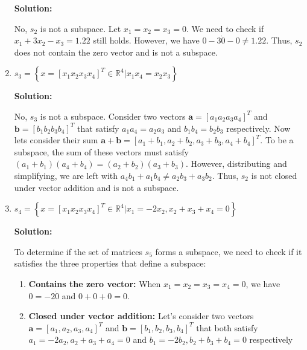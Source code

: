 \begin{enumerate}[label=(\alph*)]
	      \par \textbf{Solution:}
	      \par No, $s_2$ is not a subspace. Let $x_1 = x_2 = x_3 = 0$. We need
	      to check if $x_1 + 3x_2 - x_3 = 1.22$ still holds. However, we have $0
		      - 3 \dot 0 - 0 \neq 1.22$. Thus, $s_2$ does not contain the zero
	      vector and is not a subspace.
	\item
	      $s_{3} =
		      \left\{
		      x=\left[x_{1}x_{2}x_{3}x_{4}\right]^T \in \mathbb{R}^4 | x_1x_4 =
		      x_2x_3 \right\}$

	      \par \textbf{Solution:}
	      \par No, $s_3$ is not a subspace. Consider two vectors
	      $\mathbf{a}=\left[ a_1 a_2 a_3 a_4\right]^T$  and $\mathbf{b} = \left[ b_1 b_2
			      b_3 b_4 \right]^T$ that satisfy $a_1a_4 = a_2a_3$ and $b_1b_4
		      = b_2b_3$ respectively. Now lets consider their sum
	      $\mathbf{a} + \mathbf{b} = \left[ a_1 + b_1, a_2 + b_2, a_3 +
			      b_3, a_4 + b_4 \right]^T$. To be a subspace, the sum of these
	      vectors must satisfy $(a_1 + b_1)(a_4 + b_4) = (a_2 + b_2)(a_3
		      + b_3)$. However, distributing and simplifying, we are left
	      with $a_4b_1 + a_1b_4 \neq a_2b_3 + a_3b_2$. Thus, $s_2$ is
	      not closed under vector addition and is not a subspace.
	\item
	      $s_{4} =
		      \left\{
		      x=\left[x_{1}x_{2}x_{3}x_{4}\right]^T \in \mathbb{R}^4 | x_1 =
		      -2x_2, x_2 + x_3 + x_4 = 0 \right\}$

	      \par \textbf{Solution:}
	      \par To determine if the set of matrices $s_5$ forms a subspace, we need
	      to check if it satisfies the three properties that define a subspace:
	      \begin{enumerate}[label=\roman*.]
		      \item \textbf{Contains the zero vector:}
		            When $x_1 = x_2 = x_3 = x_4 = 0$, we have
		            $0 = -2 \dot 0$ and $0 + 0 + 0 = 0$.
		      \item \textbf{Closed under vector addition:}
		            Let's consider two vectors
		            $\mathbf{a} = \left[ a_1, a_2, a_3, a_4 \right]^T$ and $\mathbf{b} = \left[ b_1, b_2,
				            b_3, b_4 \right]^T$ that both satisfy $a_1 = -2a_2, a_2 + a_3
			            + a_4 = 0$ and $b_1 = -2b_2, b_2 + b_3 + b_4 = 0$ respectively


\end{enumerate}
\end{enumerate}
